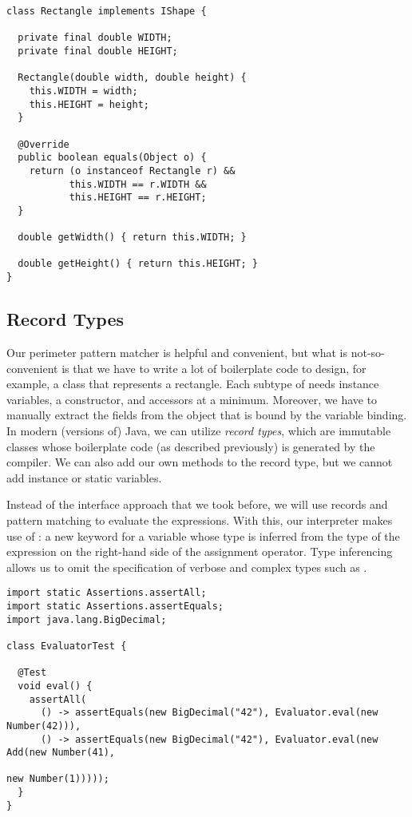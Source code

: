 \newpage %
\begin{lstlisting}[language=MyJava]
class Rectangle implements IShape {

  private final double WIDTH;
  private final double HEIGHT;

  Rectangle(double width, double height) {
    this.WIDTH = width;
    this.HEIGHT = height;
  }

  @Override
  public boolean equals(Object o) {
    return (o instanceof Rectangle r) &&
           this.WIDTH == r.WIDTH &&
           this.HEIGHT == r.HEIGHT;
  }

  double getWidth() { return this.WIDTH; }

  double getHeight() { return this.HEIGHT; }
}
\end{lstlisting}

\subsection{Record Types}

Our perimeter pattern matcher is helpful and convenient, but what is not-so-convenient is that we have to write a lot of boilerplate code to design, for example, a class that represents a rectangle. 
Each subtype of  needs instance variables, a constructor, and accessors at a minimum. 
Moreover, we have to manually extract the fields from the object that is bound by the variable binding. 
In modern (versions of) Java, we can utilize \emph{record types}, which are immutable classes whose boilerplate code (as described previously) is generated by the compiler. 
We can also add our own methods to the record type, but we cannot add instance or static variables.

Instead of the interface approach that we took before, we will use records and pattern matching to evaluate the expressions. 
With this, our interpreter makes use of : a new keyword for a variable whose type is inferred from the type of the expression on the right-hand side of the assignment operator. 
Type inferencing allows us to omit the specification of verbose and complex types such as .

\enlargethispage{2\baselineskip}
\begin{lstlisting}[language=MyJava]
import static Assertions.assertAll;
import static Assertions.assertEquals;
import java.lang.BigDecimal;

class EvaluatorTest {

  @Test
  void eval() {
    assertAll(
      () -> assertEquals(new BigDecimal("42"), Evaluator.eval(new Number(42))),
      () -> assertEquals(new BigDecimal("42"), Evaluator.eval(new Add(new Number(41), 
                                                                      new Number(1)))));
  }
}
\end{lstlisting}

